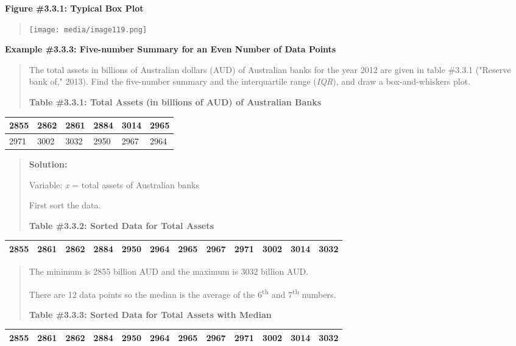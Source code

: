 \documentclass[]{book}
\begin{document}
\textbf{Figure \#3.3.1: Typical Box Plot}

\begin{quote}
\texttt{[image: media/image119.png]}
\end{quote}

\textbf{Example \#3.3.3: Five-number Summary for an Even Number of Data
Points}

\begin{quote}
The total assets in billions of Australian dollars (AUD) of Australian
banks for the year 2012 are given in table \#3.3.1 ("Reserve bank
of," 2013). Find the five-number summary and the interquartile range
(\emph{IQR}), and draw a box-and-whiskers plot.

\textbf{Table \#3.3.1: Total Assets (in billions of AUD) of Australian
Banks}
\end{quote}

\begin{longtable}[]{@{}llllll@{}}
\toprule
2855 & 2862 & 2861 & 2884 & 3014 & 2965\tabularnewline
\midrule
\endhead
2971 & 3002 & 3032 & 2950 & 2967 & 2964\tabularnewline
\bottomrule
\end{longtable}

\begin{quote}
\textbf{Solution:}

Variable: \emph{x} = total assets of Australian banks

First sort the data.

\textbf{Table \#3.3.2: Sorted Data for Total Assets}
\end{quote}

\begin{longtable}[]{@{}llllllllllll@{}}
\toprule
\endhead
2855 & 2861 & 2862 & 2884 & 2950 & 2964 & 2965 & 2967 & 2971 & 3002 & 3014 & 3032\tabularnewline
\bottomrule
\end{longtable}

\begin{quote}
The minimum is 2855 billion AUD and the maximum is 3032 billion AUD.

There are 12 data points so the median is the average of the 6\textsuperscript{th} and
7\textsuperscript{th} numbers.

\textbf{Table \#3.3.3: Sorted Data for Total Assets with Median}
\end{quote}

\begin{longtable}[]{@{}llllllllllll@{}}
\toprule
\endhead
2855 & 2861 & 2862 & 2884 & 2950 & 2964 & 2965 & 2967 & 2971 & 3002 & 3014 & 3032\tabularnewline
\bottomrule
\end{longtable}
\end{document}
